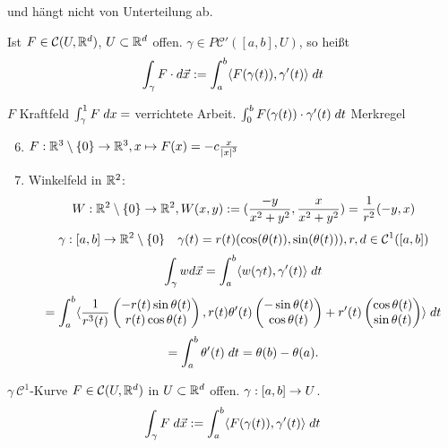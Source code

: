\documentclass[../ana2.tex]{subfiles}
\begin{document}
und hängt nicht von Unterteilung ab.
\begin{defi}[Linienintegral]
    Ist \( F \in \mathcal{C}(U, \R^d) \), \(U \subset \R^d\) offen. 
    \( \gamma \in P\mathcal{C}'([a,b], U) \), so heißt 
    \[ \int_\gamma F\cdot d \vec{x} 
    := \integralx{\scalarprod{ F(\gamma(t)) }{ \gamma'(t) } }{a}{b}{t} \]
\end{defi}
\(F\) Kraftfeld \(\integral{F}{\gamma}{1} = \) verrichtete Arbeit.
\(\integralx{F(\gamma(t))\cdot \gamma'(t)}{0}{b}{t}\) Merkregel
\begin{bsp}\leavevmode
    \begin{enumerate}
        \setcounter{enumi}{5}
        \item \( \abb{F}{\R^3 \setminus \set{0}}{\R^3}, x \mapsto F(x) = -c \frac{x}{\abs{x}^3} \)
        \item Winkelfeld in \( \R^2 \): 
        \[ \abb{W}{\R^2 \setminus \set{0}}{\R^2}, W(x,y) 
        := (\frac{-y}{x^2 + y^2} , \frac{x}{x^2 + y^2}) 
        = \frac{1}{r^2} (-y, x) \]
        \[ \abb{\gamma}{[a,b]}{\R^2 \setminus \set{0}} \quad 
        \gamma(t) = r(t) (\cos(\theta(t)), \sin(\theta(t))), r, d \in \mathcal{C}^1([a,b]) \]
        \[ \int_\gamma w d \vec{x} = \integralx{\scalarprod{w(\gamma{t})}{\gamma'(t)}}{a}{b}{t} \]
        \[ = \integralx{\scalarprod{\frac{1}{r^3(t)} \begin{pmatrix}
            -r(t) \sin \theta(t) \\
            r(t) \cos \theta(t)
        \end{pmatrix}}{r(t)\theta'(t) \begin{pmatrix}
            -\sin \theta(t) \\
            \cos \theta(t)
        \end{pmatrix} + r'(t) \begin{pmatrix}
            \cos \theta(t) \\
            \sin \theta(t)
        \end{pmatrix}}}{a}{b}{t} \]
        \[ = \integralx{\theta'(t)}{a}{b}{t} = \theta(b) - \theta(a). \]
    \end{enumerate}
\end{bsp}
\( \gamma \ \mathcal{C}^1 \)-Kurve \( F \in \mathcal{C}(U, \R^d) \)
in \(U \subset \R^d\) offen. \( \abb{\gamma}{[a,b]}{U} \).
\[\integralx{F}{\gamma}{}{\vec{x}} 
:= \integralx{\scalarprod{F(\gamma(t))}{\gamma'(t)}}{a}{b}{t}\]
\end{document}
